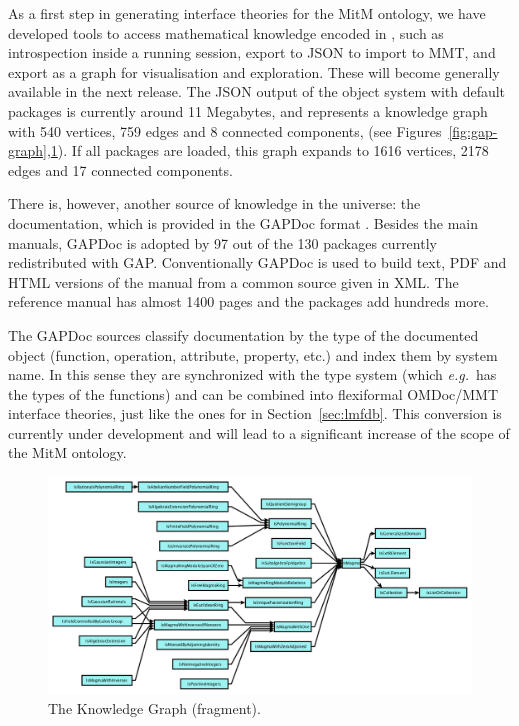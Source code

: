 As a first step in generating interface theories for the MitM ontology, we have developed
tools to access mathematical knowledge encoded in \GAP, such as introspection inside a
running \GAP session, export to JSON to import to MMT, and export as a graph for
visualisation and exploration. These will become generally available in the next \GAP
release. The JSON output of the \GAP object system with default packages is currently
around 11 Megabytes, and represents a knowledge graph with 540 vertices, 759 edges
and 8 connected components, (see Figures~\ref{fig:gap-graph},\ref{fig:gap-ismagma}). If all
packages are loaded, this graph expands to 1616 vertices, 2178 edges and 17 connected
components.

There is, however, another source of knowledge in the \GAP universe: the documentation,
which is provided in the GAPDoc format \cite{gapdoc}. Besides the main manuals, GAPDoc
is adopted by 97 out of the 130 packages currently redistributed with
GAP. Conventionally GAPDoc is used to build text, PDF and HTML versions of the manual
from a common source given in XML. The reference manual has almost 1400 pages and the
packages add hundreds more.

The GAPDoc sources classify documentation by the type of the documented object (function,
operation, attribute, property, etc.) and index them by system name. In this sense they
are synchronized with the type system (which \emph{e.g.}\ has the types of the functions) and can
be combined into flexiformal OMDoc/MMT interface theories, just like the ones for \LMFDB
in Section~\ref{sec:lmfdb}. This conversion is currently under development and will lead
to a significant increase of the scope of the MitM ontology. 

\begin{figure}[ht]\centering
  \includegraphics[width=\textwidth]{gap-ismagma}
  \caption{The \GAP Knowledge Graph (fragment).\label{fig:gap-ismagma}}
\end{figure}

